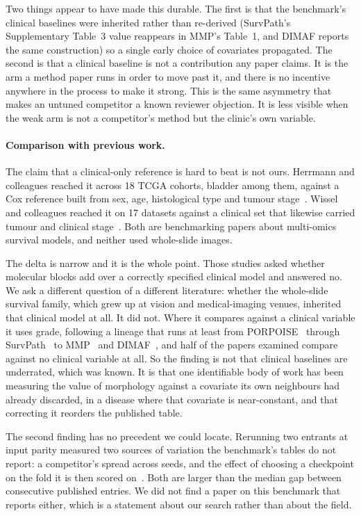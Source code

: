 \documentclass[unnumsec,webpdf,contemporary,large]{oup-authoring-template}
\begin{document}
Two things appear to have made this durable. The first is that the benchmark's clinical baselines were
inherited rather than re-derived (SurvPath's Supplementary Table~3 value reappears in MMP's Table~1, and DIMAF reports the same construction) so a single early choice of covariates
propagated. The second is that a clinical baseline is not a contribution any paper claims. It is the arm a method
paper runs in order to move past it, and there is no incentive anywhere in the process to make it
strong. This is the same asymmetry that makes an untuned competitor a known reviewer objection. It
is less visible when the weak arm is not a competitor's method but the clinic's own variable.

\paragraph{Comparison with previous work.} The claim that a
clinical-only reference is hard to beat is not ours. Herrmann and colleagues reached it across 18
TCGA cohorts, bladder among them, against a Cox reference built from sex, age, histological type and
tumour stage~\citep{herrmann2021benchmark}. Wissel and colleagues reached it on 17 datasets against
a clinical set that likewise carried tumour and clinical stage~\citep{wissel2023noise}. Both are
benchmarking papers about multi-omics survival models, and neither used whole-slide images.

The delta is narrow and it is the whole point. Those studies asked whether molecular blocks add over
a correctly specified clinical model and answered no. We ask a different question of a different
literature: whether the whole-slide survival family, which grew up at vision and medical-imaging
venues, inherited that clinical model at all. It did not. Where it compares against a clinical
variable it uses grade, following a lineage that runs at least from
PORPOISE~\citep{chen2022porpoise} through SurvPath~\citep{jaume2024survpath} to
MMP~\citep{song2024mmp} and DIMAF~\citep{eijpe2025dimaf}, and half of the papers examined compare against no clinical variable at all. So the finding is not that clinical baselines are
underrated, which was known. It is that one identifiable body of work has been measuring the value
of morphology against a covariate its own neighbours had already discarded, in a disease where that
covariate is near-constant, and that correcting it reorders the published table.

The second finding has no precedent we could locate. Rerunning two entrants at input parity
measured two sources of variation the benchmark's tables do not report: a competitor's spread across
seeds, and the effect of choosing a checkpoint on the fold it is then scored
on~\citep{zhang2024pibd}. Both are larger than the median gap between consecutive published entries.
We did not find a paper on this benchmark that reports either, which is a statement about our search
rather than about the field.
\end{document}
